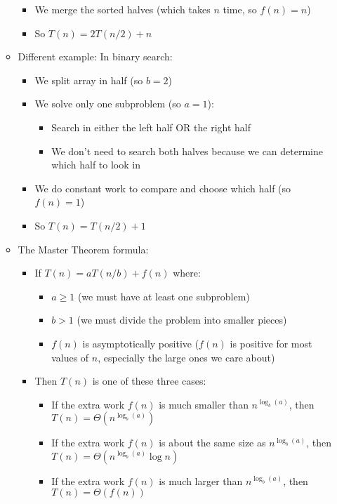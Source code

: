 \documentclass[11pt,a4paper]{article}
\begin{document}
\begin{multicols}{2}
\begin{itemize}
\begin{itemize}
\begin{itemize}
\begin{itemize}
            \end{itemize}
            \item We merge the sorted halves (which takes $n$ time, so $f(n) = n$)
            \item So $T(n) = 2T(n/2) + n$
        \end{itemize}
        \item Different example: In binary search:
        \begin{itemize}
            \item We split array in half (so $b = 2$)
            \item We solve only one subproblem (so $a = 1$):
            \begin{itemize}
                \item Search in either the left half OR the right half
                \item We don't need to search both halves because we can determine which half to look in
            \end{itemize}
            \item We do constant work to compare and choose which half (so $f(n) = 1$)
            \item So $T(n) = T(n/2) + 1$
        \end{itemize}
        \item The Master Theorem formula:
        \begin{itemize}
            \item If $T(n) = aT(n/b) + f(n)$ where:
            \begin{itemize}
                \item $a \geq 1$ (we must have at least one subproblem)
                \item $b > 1$ (we must divide the problem into smaller pieces)
                \item $f(n)$ is asymptotically positive ($f(n)$ is positive for most values of $n$, especially the large ones we care about)
            \end{itemize}
            \item Then $T(n)$ is one of these three cases:
            \begin{itemize}
                \item If the extra work $f(n)$ is much smaller than $n^{\log_b(a)}$, then $T(n) = \Theta(n^{\log_b(a)})$
                \item If the extra work $f(n)$ is about the same size as $n^{\log_b(a)}$, then $T(n) = \Theta(n^{\log_b(a)} \log n)$
                \item If the extra work $f(n)$ is much larger than $n^{\log_b(a)}$, then $T(n) = \Theta(f(n))$
            \end{itemize}
        \end{itemize}
    \end{itemize}
\end{itemize}


\end{multicols}
\end{document}
